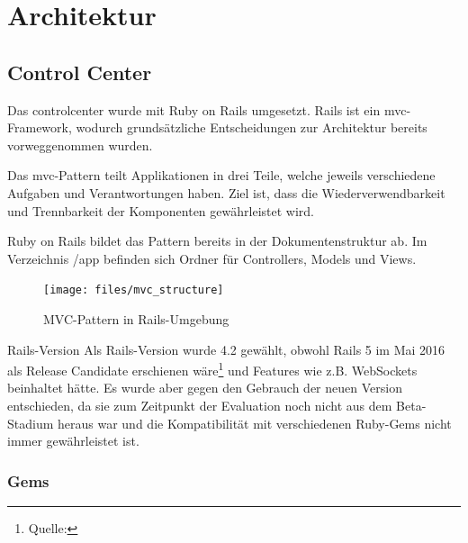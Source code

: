 \section{Architektur}

\subsection*{Control Center}

Das \gls{controlcenter} wurde mit Ruby on Rails umgesetzt. Rails ist ein \gls{mvc}-Framework, wodurch grundsätzliche Entscheidungen zur Architektur bereits vorweggenommen wurden.

Das \gls{mvc}-Pattern teilt Applikationen in drei Teile, welche jeweils verschiedene Aufgaben und Verantwortungen haben. Ziel ist, dass die Wiederverwendbarkeit und Trennbarkeit der Komponenten gewährleistet wird.

Ruby on Rails bildet das Pattern bereits in der Dokumentenstruktur ab. Im Verzeichnis /app befinden sich Ordner für Controllers, Models und Views.

\begin{figure}[H]
	\centering
	\texttt{[image: files/mvc\_structure]}
	\caption{MVC-Pattern in Rails-Umgebung}
	\label{fig:tec:mvc}
\end{figure}

\begin{decision}{Rails-Version}
Als Rails-Version wurde 4.2 gewählt, obwohl Rails 5 im Mai 2016 als Release Candidate erschienen wäre\footnote{Quelle: } und Features wie z.B. WebSockets beinhaltet hätte. Es wurde aber gegen den Gebrauch der neuen Version entschieden, da sie zum Zeitpunkt der Evaluation noch nicht aus dem Beta-Stadium heraus war und die Kompatibilität mit verschiedenen Ruby-Gems nicht immer gewährleistet ist.
\end{decision}

\subsubsection*{Gems}

